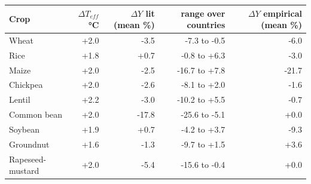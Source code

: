 \begin{tabular}{lrrrr}
\toprule
Crop & $\Delta T_{eff}$ \si{\celsius} & $\Delta Y$ lit (mean \%) & range over countries & $\Delta Y$ empirical (mean \%) \\
\midrule
Wheat & +2.0 & -3.5 & -7.3 to -0.5 & -6.0 \\
Rice & +1.8 & +0.7 & -0.8 to +6.3 & -3.0 \\
Maize & +2.0 & -2.5 & -16.7 to +7.8 & -21.7 \\
Chickpea & +2.0 & -2.6 & -8.1 to +2.0 & -1.6 \\
Lentil & +2.2 & -3.0 & -10.2 to +5.5 & -0.7 \\
Common bean & +2.0 & -17.8 & -25.6 to -5.1 & +0.0 \\
Soybean & +1.9 & +0.7 & -4.2 to +3.7 & -9.3 \\
Groundnut & +1.6 & -1.3 & -9.7 to +1.5 & +3.6 \\
Rapeseed-mustard & +2.0 & -5.4 & -15.6 to -0.4 & +0.0 \\
\bottomrule
\end{tabular}
